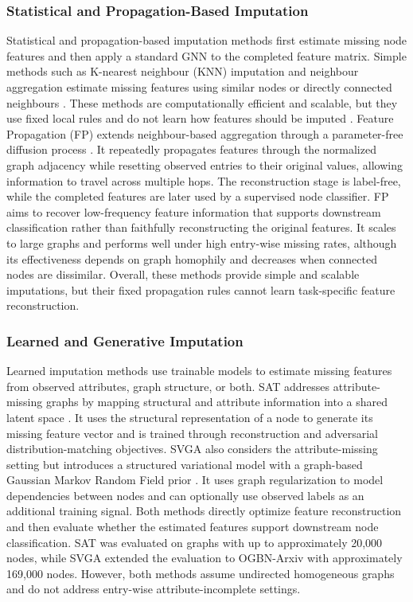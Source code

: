 \subsubsection{Statistical and Propagation-Based Imputation}
Statistical and propagation-based imputation methods first estimate missing node features and then apply a standard GNN to the completed feature matrix. Simple methods such as K-nearest neighbour (KNN) imputation and neighbour aggregation estimate missing features using similar nodes or directly connected neighbours \cite{you2020handling}. These methods are computationally efficient and scalable, but they use fixed local rules and do not learn how features should be imputed \cite{yoo2022accurate}. Feature Propagation (FP) extends neighbour-based aggregation through a parameter-free diffusion process \cite{rossi2022unreasonable}. It repeatedly propagates features through the normalized graph adjacency while resetting observed entries to their original values, allowing information to travel across multiple hops. The reconstruction stage is label-free, while the completed features are later used by a supervised node classifier. FP aims to recover low-frequency feature information that supports downstream classification rather than faithfully reconstructing the original features. It scales to large graphs and performs well under high entry-wise missing rates, although its effectiveness depends on graph homophily and decreases when connected nodes are dissimilar. Overall, these methods provide simple and scalable imputations, but their fixed propagation rules cannot learn task-specific feature reconstruction.

\subsubsection{Learned and Generative Imputation}
Learned imputation methods use trainable models to estimate missing features from observed attributes, graph structure, or both. SAT addresses attribute-missing graphs by mapping structural and attribute information into a shared latent space \cite{chen2020learning}. It uses the structural representation of a node to generate its missing feature vector and is trained through reconstruction and adversarial distribution-matching objectives. SVGA also considers the attribute-missing setting but introduces a structured variational model with a graph-based Gaussian Markov Random Field prior \cite{yoo2022accurate}. It uses graph regularization to model dependencies between nodes and can optionally use observed labels as an additional training signal. Both methods directly optimize feature reconstruction and then evaluate whether the estimated features support downstream node classification. SAT was evaluated on graphs with up to approximately 20,000 nodes, while SVGA extended the evaluation to OGBN-Arxiv with approximately 169,000 nodes. However, both methods assume undirected homogeneous graphs and do not address entry-wise attribute-incomplete settings.

